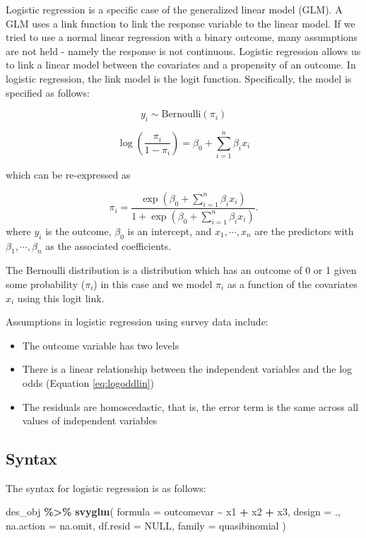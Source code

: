 \documentclass[
]{krantz}
\makeatletter
\newenvironment{Shaded}{\begin{snugshade}}{\end{snugshade}}
\newcommand{\AttributeTok}[1]{\textcolor[rgb]{0.27,0.27,0.27}{#1}}
\newcommand{\ConstantTok}[1]{\textcolor[rgb]{0.37,0.37,0.37}{#1}}
\newcommand{\FunctionTok}[1]{\textcolor[rgb]{0.27,0.27,0.27}{\textbf{#1}}}
\newcommand{\NormalTok}[1]{#1}
\newcommand{\SpecialCharTok}[1]{\textcolor[rgb]{0.43,0.43,0.43}{\textbf{#1}}}
\providecommand{\tightlist}{%
  \setlength{\itemsep}{0pt}\setlength{\parskip}{0pt}}
\newenvironment{kframe}{%
\medskip{}
\setlength{\fboxsep}{.8em}
 \def\at@end@of@kframe{}%
 \ifinner\ifhmode%
  \def\at@end@of@kframe{\end{minipage}}%
  \begin{minipage}{\columnwidth}%
 \fi\fi%
 \def\FrameCommand##1{\hskip\@totalleftmargin \hskip-\fboxsep
 \colorbox{shadecolor}{##1}\hskip-\fboxsep
     \hskip-\linewidth \hskip-\@totalleftmargin \hskip\columnwidth}%
 \MakeFramed {\advance\hsize-\width
   \@totalleftmargin\z@ \linewidth\hsize
   \@setminipage}}%
 {\par\unskip\endMakeFramed%
 \at@end@of@kframe}
\renewenvironment{Shaded}{\begin{kframe}}{\end{kframe}}
\makeatother
\begin{document}
Logistic regression is a specific case of the generalized linear model (GLM). A GLM uses a link function to link the response variable to the linear model. If we tried to use a normal linear regression with a binary outcome, many assumptions are not held - namely the response is not continuous. Logistic regression allows us to link a linear model between the covariates and a propensity of an outcome. In logistic regression, the link model is the logit function. Specifically, the model is specified as follows:

\[ y_i \sim \text{Bernoulli}(\pi_i)\]

\begin{equation}
\log \left(\frac{\pi_i}{1-\pi_i} \right)=\beta_0 +\sum_{i=1}^n \beta_i x_i
\label{eq:logoddlin}
\end{equation}

which can be re-expressed as

\[ \pi_i=\frac{\exp \left(\beta_0 +\sum_{i=1}^n \beta_i x_i \right)}{1+\exp \left(\beta_0 +\sum_{i=1}^n \beta_i x_i \right)}.\] where \(y_i\) is the outcome, \(\beta_0\) is an intercept, and \(x_1, \cdots, x_n\) are the predictors with \(\beta_1, \cdots, \beta_n\) as the associated coefficients.

The Bernoulli distribution is a distribution which has an outcome of 0 or 1 given some probability (\(\pi_i\)) in this case and we model \(\pi_i\) as a function of the covariates \(x_i\) using this logit link.

Assumptions in logistic regression using survey data include:

\begin{itemize}
\tightlist
\item
  The outcome variable has two levels
\item
  There is a linear relationship between the independent variables and the log odds (Equation \eqref{eq:logoddlin})
\item
  The residuals are homoscedastic, that is, the error term is the same across all values of independent variables
\end{itemize}

\hypertarget{syntax-8}{%
\subsection{Syntax}\label{syntax-8}}

The syntax for logistic regression is as follows:

\begin{Shaded}
\begin{Highlighting}[]
\NormalTok{des\_obj }\SpecialCharTok{\%\textgreater{}\%}
  \FunctionTok{svyglm}\NormalTok{(}
    \AttributeTok{formula =}\NormalTok{ outcomevar }\SpecialCharTok{\textasciitilde{}}\NormalTok{ x1 }\SpecialCharTok{+}\NormalTok{ x2 }\SpecialCharTok{+}\NormalTok{ x3,}
    \AttributeTok{design =}\NormalTok{ .,}
    \AttributeTok{na.action =}\NormalTok{ na.omit,}
    \AttributeTok{df.resid =} \ConstantTok{NULL}\NormalTok{,}
    \AttributeTok{family =}\NormalTok{ quasibinomial}
\NormalTok{  )}
\end{Highlighting}
\end{Shaded}
\end{document}
